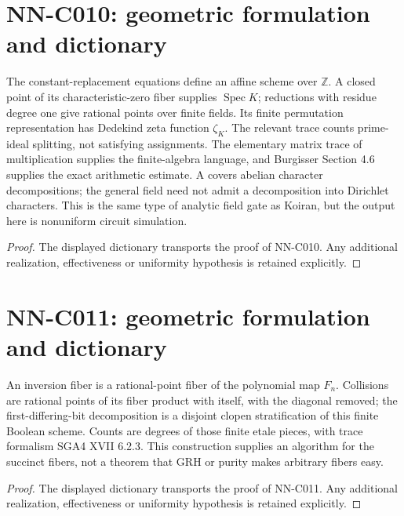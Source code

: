 \section{NN-C010: geometric formulation and dictionary}
\begin{geometricstatement}[NN-C010]
The constant-replacement equations define an affine scheme over $\mathbb Z$. A closed point of its characteristic-zero fiber supplies $\operatorname{Spec}K$; reductions with residue degree one give rational points over finite fields. Its finite permutation representation has Dedekind zeta function $\zeta_K$. The relevant trace counts prime-ideal splitting, not satisfying assignments. The elementary matrix trace of multiplication supplies the finite-algebra language, and Burgisser Section 4.6 supplies the exact arithmetic estimate. A covers abelian character decompositions; the general field need not admit a decomposition into Dirichlet characters. This is the same type of analytic field gate as Koiran, but the output here is nonuniform circuit simulation.
\end{geometricstatement}
\begin{proof} The displayed dictionary transports the proof of NN-C010. Any additional realization, effectiveness or uniformity hypothesis is retained explicitly.\end{proof}


\section{NN-C011: geometric formulation and dictionary}
\begin{geometricstatement}[NN-C011]
An inversion fiber is a rational-point fiber of the polynomial map $F_n$. Collisions are rational points of its fiber product with itself, with the diagonal removed; the first-differing-bit decomposition is a disjoint clopen stratification of this finite Boolean scheme. Counts are degrees of those finite etale pieces, with trace formalism SGA4 XVII 6.2.3. This construction supplies an algorithm for the succinct fibers, not a theorem that GRH or purity makes arbitrary fibers easy.
\end{geometricstatement}
\begin{proof} The displayed dictionary transports the proof of NN-C011. Any additional realization, effectiveness or uniformity hypothesis is retained explicitly.\end{proof}


